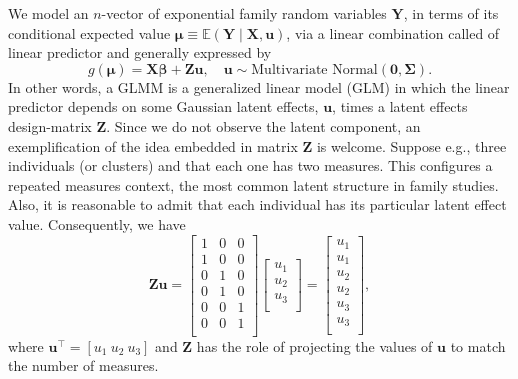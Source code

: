 We model an \(n\)-vector of exponential family random variables
\(\bm{Y}\), in terms of its conditional expected value \(\bm{\mu} \equiv
\mathbb{E}(\bm{Y} \mid \bm{X,u})\), via a linear combination called of
linear predictor and generally expressed by
\begin{equation}
 g(\bm{\mu}) = \bm{X\beta} + \bm{Zu}, \quad
 \bm{u} \sim \text{Multivariate Normal}(\bm{0,\Sigma}).
 \label{eq:gmu}
\end{equation}
In other words, a GLMM \cite{GLMM} is a generalized linear model (GLM)
in which the linear predictor depends on some Gaussian latent effects,
\(\bm{u}\), times a latent effects design-matrix \(\bm{Z}\). Since we do
not observe the latent component, an exemplification of the idea
embedded in matrix \(\bm{Z}\) is welcome. Suppose e.g., three
individuals (or clusters) and that each one has two measures. This
configures a repeated measures context, the most common latent structure
in family studies. Also, it is reasonable to admit that each individual
has its particular latent effect value. Consequently, we have
\[
 \bm{Zu} = \begin{bmatrix}
            1 & 0 & 0\\1 & 0 & 0\\
            0 & 1 & 0\\0 & 1 & 0\\
            0 & 0 & 1\\0 & 0 & 1\\
           \end{bmatrix} \begin{bmatrix}
                          u_{1}\\u_{2}\\u_{3}\\
                         \end{bmatrix} = \begin{bmatrix}
                                          u_{1}\\u_{1}\\
                                          u_{2}\\u_{2}\\
                                          u_{3}\\u_{3}\\
                                         \end{bmatrix},
\]
where \(\bm{u}^{\top} = [u_{1}~u_{2}~u_{3}]\) and \(\bm{Z}\) has the
role of projecting the values of \(\bm{u}\) to match the number of
measures.

